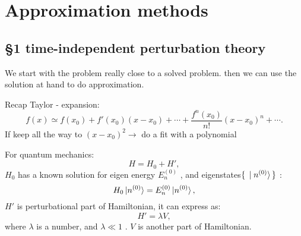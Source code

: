 \documentclass[11pt,a4paper]{report}
\begin{document}
\setcounter{chapter}{4}
\chapter{Approximation methods}
\section*{\S1 time-independent perturbation theory}

\thispagestyle{fancy}
\fancyhead{}

We start with the problem really close to a solved problem. then we can use the solution at hand to do approximation. 

Recap Taylor - expansion:
\begin{equation}
   f(x)\simeq f(x_0)+f'(x_0)(x-x_0)+\cdots+\frac{f^n(x_0)}{n!}(x-x_0)^n+\cdots . 
\end{equation}
If keep all the way to $(x-x_0)^2 \longrightarrow$ do a fit with a polynomial

For quantum mechanics:
\begin{equation}
    H=H_0+H' , 
\end{equation}
$H_0$ has a known solution for eigen energy $E^{(0)}_n$ , and eigenstates$\set{\ket{n^{(0)}}}$ :
\begin{equation}
    H_0\ket{n^{(0)}}=E^{(0)}_n\ket{n^{(0)}} , 
\end{equation}
$H'$ is perturbational part of Hamiltonian, it can express as:
\begin{equation}
    H'=\lambda V ,
\end{equation}
where $\lambda$ is a number, and $\lambda\ll1$ . $V$ is another part of Hamiltonian.
\end{document}

